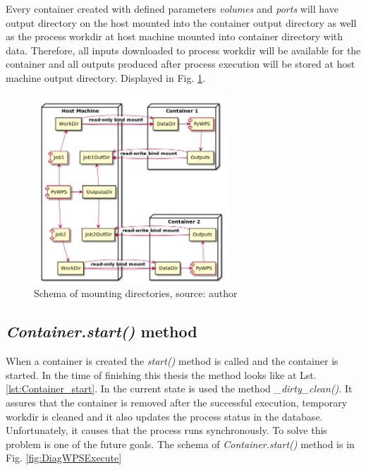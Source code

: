 Every container created with defined parameters \textit{volumes} and
\textit{ports} will have output directory on the host mounted into the
container output directory as well as the process workdir at host
machine mounted into container directory with data. Therefore, all
inputs downloaded to process workdir will be available for the
container and all outputs produced after process execution will be
stored at host machine output directory. Displayed in
Fig. \ref{fig:Diag_mount}.

\begin{figure}[h!]
\centering
\includegraphics[width=0.65\textwidth]{img/Diag_mount.png}
\caption{Schema of mounting directories, source: author}
\label{fig:Diag_mount}
\end{figure}


\subsection{\textit{Container.start()} method}
When a container is created the \textit{start()} method is called and the container is started.
In the time of finishing this thesis the method looks like at Lst.\ref{lst:Container_start}. In the current state is used the method
\textit{\_dirty\_clean()}. It assures that the container is removed after the successful execution, temporary workdir is cleaned and it also 
updates the process status in the database. Unfortunately, it causes that the process runs synchronously. To solve this problem is one of the future goals. The schema of \textit{Container.start()} method is in Fig. \ref{fig:DiagWPSExecute}

